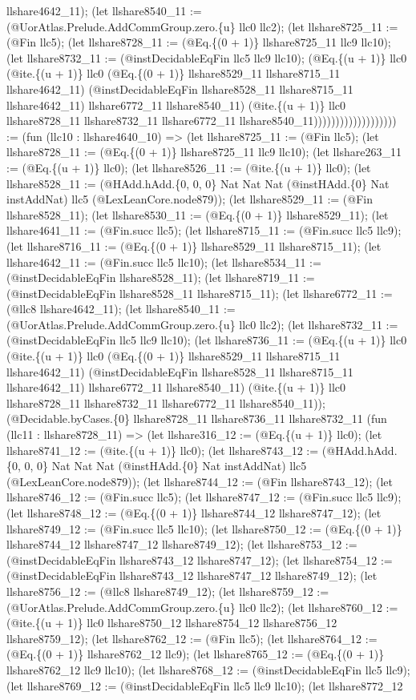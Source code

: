 \documentclass[11pt]{article}
\begin{document}
llshare4642\_11); (let llshare8540\_11 := (@UorAtlas.Prelude.AddCommGroup.zero.\{u\} llc0 llc2); (let llshare8725\_11 := (@Fin llc5); (let llshare8728\_11 := (@Eq.\{(0 + 1)\} llshare8725\_11 llc9 llc10); (let llshare8732\_11 := (@instDecidableEqFin llc5 llc9 llc10); (@Eq.\{(u + 1)\} llc0 (@ite.\{(u + 1)\} llc0 (@Eq.\{(0 + 1)\} llshare8529\_11 llshare8715\_11 llshare4642\_11) (@instDecidableEqFin llshare8528\_11 llshare8715\_11 llshare4642\_11) llshare6772\_11 llshare8540\_11) (@ite.\{(u + 1)\} llc0 llshare8728\_11 llshare8732\_11 llshare6772\_11 llshare8540\_11))))))))))))))))))) := (fun (llc10 : llshare4640\_10) => (let llshare8725\_11 := (@Fin llc5); (let llshare8728\_11 := (@Eq.\{(0 + 1)\} llshare8725\_11 llc9 llc10); (let llshare263\_11 := (@Eq.\{(u + 1)\} llc0); (let llshare8526\_11 := (@ite.\{(u + 1)\} llc0); (let llshare8528\_11 := (@HAdd.hAdd.\{0, 0, 0\} Nat Nat Nat (@instHAdd.\{0\} Nat instAddNat) llc5 (@LexLeanCore.node879)); (let llshare8529\_11 := (@Fin llshare8528\_11); (let llshare8530\_11 := (@Eq.\{(0 + 1)\} llshare8529\_11); (let llshare4641\_11 := (@Fin.succ llc5); (let llshare8715\_11 := (@Fin.succ llc5 llc9); (let llshare8716\_11 := (@Eq.\{(0 + 1)\} llshare8529\_11 llshare8715\_11); (let llshare4642\_11 := (@Fin.succ llc5 llc10); (let llshare8534\_11 := (@instDecidableEqFin llshare8528\_11); (let llshare8719\_11 := (@instDecidableEqFin llshare8528\_11 llshare8715\_11); (let llshare6772\_11 := (@llc8 llshare4642\_11); (let llshare8540\_11 := (@UorAtlas.Prelude.AddCommGroup.zero.\{u\} llc0 llc2); (let llshare8732\_11 := (@instDecidableEqFin llc5 llc9 llc10); (let llshare8736\_11 := (@Eq.\{(u + 1)\} llc0 (@ite.\{(u + 1)\} llc0 (@Eq.\{(0 + 1)\} llshare8529\_11 llshare8715\_11 llshare4642\_11) (@instDecidableEqFin llshare8528\_11 llshare8715\_11 llshare4642\_11) llshare6772\_11 llshare8540\_11) (@ite.\{(u + 1)\} llc0 llshare8728\_11 llshare8732\_11 llshare6772\_11 llshare8540\_11)); (@Decidable.byCases.\{0\} llshare8728\_11 llshare8736\_11 llshare8732\_11 (fun (llc11 : llshare8728\_11) => (let llshare316\_12 := (@Eq.\{(u + 1)\} llc0); (let llshare8741\_12 := (@ite.\{(u + 1)\} llc0); (let llshare8743\_12 := (@HAdd.hAdd.\{0, 0, 0\} Nat Nat Nat (@instHAdd.\{0\} Nat instAddNat) llc5 (@LexLeanCore.node879)); (let llshare8744\_12 := (@Fin llshare8743\_12); (let llshare8746\_12 := (@Fin.succ llc5); (let llshare8747\_12 := (@Fin.succ llc5 llc9); (let llshare8748\_12 := (@Eq.\{(0 + 1)\} llshare8744\_12 llshare8747\_12); (let llshare8749\_12 := (@Fin.succ llc5 llc10); (let llshare8750\_12 := (@Eq.\{(0 + 1)\} llshare8744\_12 llshare8747\_12 llshare8749\_12); (let llshare8753\_12 := (@instDecidableEqFin llshare8743\_12 llshare8747\_12); (let llshare8754\_12 := (@instDecidableEqFin llshare8743\_12 llshare8747\_12 llshare8749\_12); (let llshare8756\_12 := (@llc8 llshare8749\_12); (let llshare8759\_12 := (@UorAtlas.Prelude.AddCommGroup.zero.\{u\} llc0 llc2); (let llshare8760\_12 := (@ite.\{(u + 1)\} llc0 llshare8750\_12 llshare8754\_12 llshare8756\_12 llshare8759\_12); (let llshare8762\_12 := (@Fin llc5); (let llshare8764\_12 := (@Eq.\{(0 + 1)\} llshare8762\_12 llc9); (let llshare8765\_12 := (@Eq.\{(0 + 1)\} llshare8762\_12 llc9 llc10); (let llshare8768\_12 := (@instDecidableEqFin llc5 llc9); (let llshare8769\_12 := (@instDecidableEqFin llc5 llc9 llc10); (let llshare8772\_12 
\end{document}

